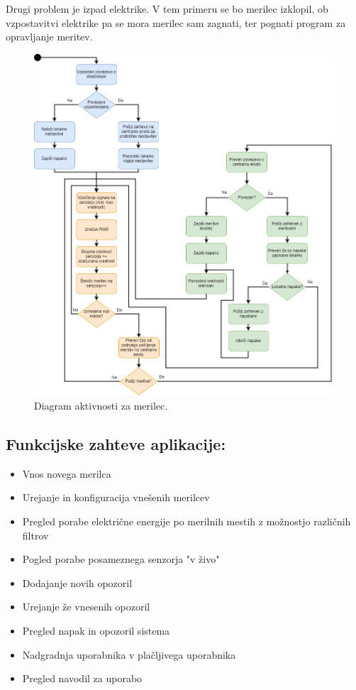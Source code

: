 \documentclass[12pt,a4paper,titlepage,openany]{report}
\begin{document}
Drugi problem je izpad elektrike. V tem primeru se bo merilec izklopil, ob vzpostavitvi elektrike pa se mora merilec sam zagnati, ter pognati program za opravljanje meritev.


\begin{figure}[H]
\begin{center}
\includegraphics[width=1\linewidth]{Slike/ActivityMerilec.png}
\end{center}
\caption{Diagram aktivnosti za merilec.}\label{slika:ActivityMerilec}
\end{figure}


\subsection{Funkcijske zahteve aplikacije:}



\begin{itemize}
\item Vnos novega merilca
\item Urejanje in konfiguracija vnešenih merilcev
\item Pregled porabe električne energije po merilnih mestih z možnostjo različnih filtrov
\item Pogled porabe posameznega senzorja "v živo"
\item Dodajanje novih opozoril
\item Urejanje že vnesenih opozoril
\item Pregled napak in opozoril sistema
\item Nadgradnja uporabnika v plačljivega uporabnika
\item Pregled navodil za uporabo
\end{itemize}
\end{document}
